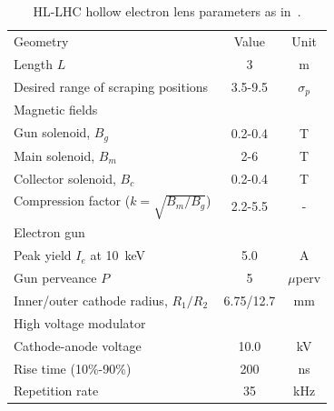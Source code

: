 \documentclass[%
 reprint,
 amsmath,amssymb,
 aps,
prstab,
]{revtex4-1}
\begin{document}
\begin{table}[t]
	\caption{\label{tab:hel_param}%
		HL-LHC hollow electron lens parameters as in~\cite{hel_cdr}.
	}
	\begin{ruledtabular}
		\begin{tabular}{lcc}
			Geometry & Value& Unit\\
			\colrule
			Length $L$    &  3 & m\\
			Desired range of scraping positions & 3.5-9.5 &$\sigma_p$\\
			\colrule
			Magnetic fields & & \\
			\colrule
			Gun solenoid, $B_g$ & 0.2-0.4 & T\\
			Main solenoid, $B_m$ & 2-6 & T\\
			Collector solenoid, $B_c$ & 0.2-0.4 & T\\
			Compression factor ($k=\sqrt{B_m/B_g}$) & 2.2-5.5 & -\\
			\colrule
			Electron gun & & \\
			\colrule
			Peak yield $I_e$ at 10~keV & 5.0 & A\\
			Gun perveance $P$ & 5 & $\mu$perv\\
			Inner/outer cathode radius, $R_1/R_2$ & 6.75/12.7 & mm\\
			\colrule
			High voltage modulator & & \\
			\colrule
			Cathode-anode voltage & 10.0 & kV\\
			Rise time (10\%-90\%) & 200 & ns \\
			Repetition rate & 35 & kHz
		\end{tabular}
	\end{ruledtabular}
\end{table}
\end{document}

